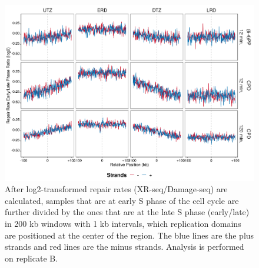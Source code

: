 \begin{figure}[H]
\begin{center}
\includegraphics[width=\textwidth]{Chapters/7_appendix/figures/supfig27}
\caption[Repair rate early/late phase ratio of replication domains in 200 kb (replicate B).]{After log2-transformed repair rates (XR-seq/Damage-seq) are calculated, samples that are at early S phase of the cell cycle are further divided by the ones that are at the late S phase (early/late) in 200 kb windows with 1 kb intervals, which replication domains are positioned at the center of the region. The blue lines are the plus strands and red lines are the minus strands. Analysis is performed on replicate B.}
\label{supfig:rrel200repdomainB}
\end{center}
\end{figure}

